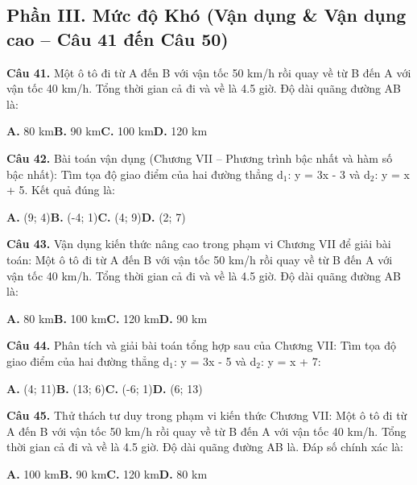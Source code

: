 \documentclass[11pt,a4paper]{article}
\begin{document}
\subsection*{\color{accent} Phần III. Mức độ Khó (Vận dụng \& Vận dụng cao -- Câu 41 đến Câu 50)}
\textbf{\color{primary} Câu 41.} Một ô tô đi từ A đến B với vận tốc 50 km/h rồi quay về từ B đến A với vận tốc 40 km/h. Tổng thời gian cả đi và về là 4.5 giờ. Độ dài quãng đường AB là:\par
\hspace*{1.5em}\textbf{A.} 80 km\quad\quad \textbf{B.} 90 km\quad\quad \textbf{C.} 100 km\quad\quad \textbf{D.} 120 km\par\vspace{2pt}
\textbf{\color{primary} Câu 42.} Bài toán vận dụng (Chương VII – Phương trình bậc nhất và hàm số bậc nhất): Tìm tọa độ giao điểm của hai đường thẳng d$_1$: y = 3x - 3 và d$_2$: y = x + 5. Kết quả đúng là:\par
\hspace*{1.5em}\textbf{A.} (9; 4)\quad\quad \textbf{B.} (-4; 1)\quad\quad \textbf{C.} (4; 9)\quad\quad \textbf{D.} (2; 7)\par\vspace{2pt}
\textbf{\color{primary} Câu 43.} Vận dụng kiến thức nâng cao trong phạm vi Chương VII để giải bài toán: Một ô tô đi từ A đến B với vận tốc 50 km/h rồi quay về từ B đến A với vận tốc 40 km/h. Tổng thời gian cả đi và về là 4.5 giờ. Độ dài quãng đường AB là:\par
\hspace*{1.5em}\textbf{A.} 80 km\quad\quad \textbf{B.} 100 km\quad\quad \textbf{C.} 120 km\quad\quad \textbf{D.} 90 km\par\vspace{2pt}
\textbf{\color{primary} Câu 44.} Phân tích và giải bài toán tổng hợp sau của Chương VII: Tìm tọa độ giao điểm của hai đường thẳng d$_1$: y = 3x - 5 và d$_2$: y = x + 7:\par
\hspace*{1.5em}\textbf{A.} (4; 11)\quad\quad \textbf{B.} (13; 6)\quad\quad \textbf{C.} (-6; 1)\quad\quad \textbf{D.} (6; 13)\par\vspace{2pt}
\textbf{\color{primary} Câu 45.} Thử thách tư duy trong phạm vi kiến thức Chương VII: Một ô tô đi từ A đến B với vận tốc 50 km/h rồi quay về từ B đến A với vận tốc 40 km/h. Tổng thời gian cả đi và về là 4.5 giờ. Độ dài quãng đường AB là. Đáp số chính xác là:\par
\hspace*{1.5em}\textbf{A.} 100 km\quad\quad \textbf{B.} 90 km\quad\quad \textbf{C.} 120 km\quad\quad \textbf{D.} 80 km\par\vspace{2pt}
\end{document}

